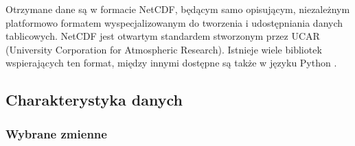 Otrzymane dane są w formacie NetCDF, będącym samo opisującym, niezależnym platformowo formatem
wyspecjalizowanym do tworzenia i udostępniania danych tablicowych. NetCDF jest otwartym standardem
stworzonym przez UCAR (University Corporation for Atmospheric Research). Istnieje wiele bibliotek
wspierających ten format, między innymi dostępne są także w języku Python \cite{python}.

\subsection{Charakterystyka danych}

\subsubsection*{Wybrane zmienne}

